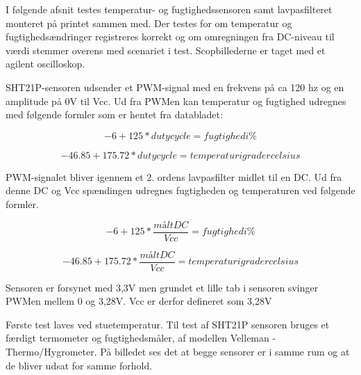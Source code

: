 

I følgende afsnit testes temperatur- og fugtighedssensoren samt lavpasfilteret monteret på printet sammen med. Der testes for om temperatur og fugtighedsændringer registreres korrekt og om omregningen fra DC-niveau til værdi stemmer overens med scenariet i test. Scopbillederne er taget med et agilent oscilloskop.

SHT21P-sensoren udsender et PWM-signal med en frekvens på ca 120 hz og en amplitude på 0V til Vcc. Ud fra PWMen kan temperatur og fugtighed udregnes med følgende formler som er hentet fra databladet:

\begin{equation}
-6+125*duty cycle= fugtighed i \%
\end{equation}

\begin{equation}
-46.85+175.72*duty cycle= temperatur i grader celsius
\end{equation}

PWM-signalet bliver igennem et 2. ordens lavpasfilter midlet til en DC. Ud fra denne DC og Vcc spændingen udregnes fugtigheden og temperaturen ved følgende formler. 

\begin{equation}
-6+125*\frac{målt DC}{Vcc}= fugtighed i \%
\end{equation}

\begin{equation}
-46.85+175.72*\frac{målt DC}{Vcc}=temperatur i grader celsius
\end{equation}

Sensoren er forsynet med 3,3V men grundet et lille tab i sensoren svinger PWMen mellem 0 og 3,28V. Vcc er derfor defineret som 3,28V



Første test laves ved stuetemperatur. Til test af SHT21P sensoren bruges et færdigt termometer og fugtighedsmåler, af modellen Velleman - Thermo/Hygrometer. På billedet ses det at begge sensorer er i samme rum og at de bliver udsat for samme forhold. 

